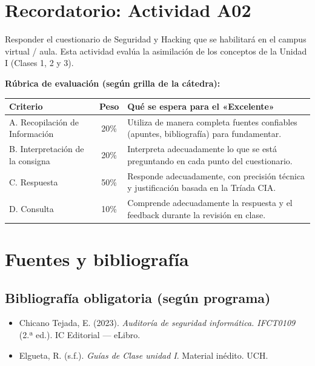 \documentclass[11pt,a4paper]{article}
\begin{document}
\section{Recordatorio: Actividad A02}
\begin{clave}
Responder el cuestionario de Seguridad y Hacking que se habilitará en el campus virtual / aula. Esta actividad evalúa la asimilación de los conceptos de la Unidad I (Clases 1, 2 y 3).
\end{clave}

\textbf{Rúbrica de evaluación (según grilla de la cátedra):}
\begin{center}
\renewcommand{\arraystretch}{1.2}
\begin{tabularx}{\textwidth}{@{} l c X @{}}
\toprule
\textbf{Criterio} & \textbf{Peso} & \textbf{Qué se espera para el «Excelente»} \\
\midrule
A. Recopilación de Información & 20\% & Utiliza de manera completa fuentes confiables (apuntes, bibliografía) para fundamentar. \\
B. Interpretación de la consigna & 20\% & Interpreta adecuadamente lo que se está preguntando en cada punto del cuestionario. \\
C. Respuesta & 50\% & Responde adecuadamente, con precisión técnica y justificación basada en la Tríada CIA. \\
D. Consulta & 10\% & Comprende adecuadamente la respuesta y el feedback durante la revisión en clase. \\
\bottomrule
\end{tabularx}
\end{center}

\section{Fuentes y bibliografía}

\subsection{Bibliografía obligatoria (según programa)}
\begin{itemize}[leftmargin=*]
  \item Chicano Tejada, E. (2023). \textit{Auditoría de seguridad informática. IFCT0109} (2.ª ed.). IC Editorial --- eLibro.
  \item Elgueta, R. (s.f.). \textit{Guías de Clase unidad I}. Material inédito. UCH.
\end{itemize}
\end{document}
